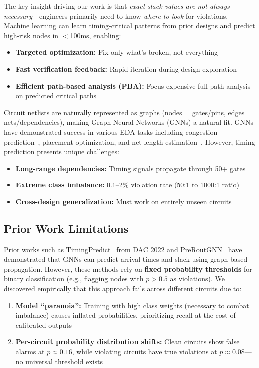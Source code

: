 \documentclass[10pt,twocolumn,journal]{IEEEtran}
\begin{document}
The key insight driving our work is that \textit{exact slack values are not always necessary}---engineers primarily need to know \textit{where to look} for violations. Machine learning can learn timing-critical patterns from prior designs and predict high-risk nodes in $<$100ms, enabling:
\begin{itemize}
    \item \textbf{Targeted optimization:} Fix only what's broken, not everything
    \item \textbf{Fast verification feedback:} Rapid iteration during design exploration
    \item \textbf{Efficient path-based analysis (PBA):} Focus expensive full-path analysis on predicted critical paths
\end{itemize}

Circuit netlists are naturally represented as graphs (nodes = gates/pins, edges = nets/dependencies), making Graph Neural Networks (GNNs) a natural fit. GNNs have demonstrated success in various EDA tasks including congestion prediction~\cite{kirby2019congestionnet}, placement optimization, and net length estimation~\cite{xie2021net2}. However, timing prediction presents unique challenges:
\begin{itemize}
    \item \textbf{Long-range dependencies:} Timing signals propagate through 50+ gates
    \item \textbf{Extreme class imbalance:} 0.1--2\% violation rate (50:1 to 1000:1 ratio)
    \item \textbf{Cross-design generalization:} Must work on entirely unseen circuits
\end{itemize}

\subsection{Prior Work Limitations}

Prior works such as TimingPredict~\cite{guo2022timingpredict} from DAC 2022 and PreRoutGNN~\cite{zhong2024preroutgnn} have demonstrated that GNNs can predict arrival times and slack using graph-based propagation. However, these methods rely on \textbf{fixed probability thresholds} for binary classification (e.g., flagging nodes with $p > 0.5$ as violations). We discovered empirically that this approach fails across different circuits due to:
\begin{enumerate}
    \item \textbf{Model ``paranoia'':} Training with high class weights (necessary to combat imbalance) causes inflated probabilities, prioritizing recall at the cost of calibrated outputs
    \item \textbf{Per-circuit probability distribution shifts:} Clean circuits show false alarms at $p \approx 0.16$, while violating circuits have true violations at $p \approx 0.08$---no universal threshold exists
\end{enumerate}
\end{document}
